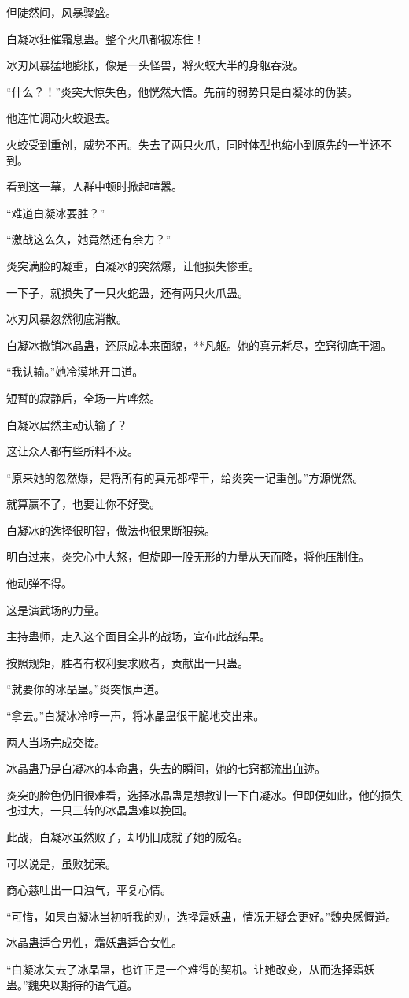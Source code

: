 \begin{this_body}
但陡然间，风暴骤盛。

白凝冰狂催霜息蛊。整个火爪都被冻住！

冰刃风暴猛地膨胀，像是一头怪兽，将火蛟大半的身躯吞没。

“什么？！”炎突大惊失色，他恍然大悟。先前的弱势只是白凝冰的伪装。

他连忙调动火蛟退去。

火蛟受到重创，威势不再。失去了两只火爪，同时体型也缩小到原先的一半还不到。

看到这一幕，人群中顿时掀起喧嚣。

“难道白凝冰要胜？”

“激战这么久，她竟然还有余力？”

炎突满脸的凝重，白凝冰的突然爆，让他损失惨重。

一下子，就损失了一只火蛇蛊，还有两只火爪蛊。

冰刃风暴忽然彻底消散。

白凝冰撤销冰晶蛊，还原成本来面貌，**凡躯。她的真元耗尽，空窍彻底干涸。

“我认输。”她冷漠地开口道。

短暂的寂静后，全场一片哗然。

白凝冰居然主动认输了？

这让众人都有些所料不及。

“原来她的忽然爆，是将所有的真元都榨干，给炎突一记重创。”方源恍然。

就算赢不了，也要让你不好受。

白凝冰的选择很明智，做法也很果断狠辣。

明白过来，炎突心中大怒，但旋即一股无形的力量从天而降，将他压制住。

他动弹不得。

这是演武场的力量。

主持蛊师，走入这个面目全非的战场，宣布此战结果。

按照规矩，胜者有权利要求败者，贡献出一只蛊。

“就要你的冰晶蛊。”炎突恨声道。

“拿去。”白凝冰冷哼一声，将冰晶蛊很干脆地交出来。

两人当场完成交接。

冰晶蛊乃是白凝冰的本命蛊，失去的瞬间，她的七窍都流出血迹。

炎突的脸色仍旧很难看，选择冰晶蛊是想教训一下白凝冰。但即便如此，他的损失也过大，一只三转的冰晶蛊难以挽回。

此战，白凝冰虽然败了，却仍旧成就了她的威名。

可以说是，虽败犹荣。

商心慈吐出一口浊气，平复心情。

“可惜，如果白凝冰当初听我的劝，选择霜妖蛊，情况无疑会更好。”魏央感慨道。

冰晶蛊适合男性，霜妖蛊适合女性。

“白凝冰失去了冰晶蛊，也许正是一个难得的契机。让她改变，从而选择霜妖蛊。”魏央以期待的语气道。

\end{this_body}

